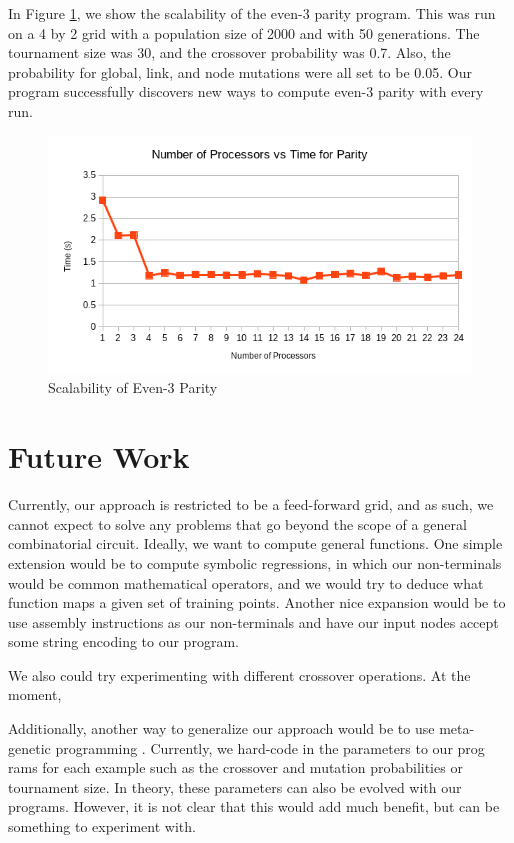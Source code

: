 \documentclass[12pt,conference]{IEEEtran}
\begin{document}
	In Figure \ref{parity_scalability}, we show the scalability of the even-3 parity program. This was run on a 4 by 2 grid with a population size of 2000 and with 50 generations. The tournament size was 30, and the crossover probability was 0.7. Also, the probability for global, link, and node mutations were all set to be 0.05. Our program successfully discovers new ways to compute even-3 parity with every run.

\begin{figure}
	\centering
	\includegraphics{parity_scalability.png}
	\caption{Scalability of Even-3 Parity}
	\label{parity_scalability}
\end{figure}
	
	\section{Future Work}
	
	Currently, our approach is restricted to be a feed-forward grid, and as such, we cannot expect to solve any problems that go beyond the scope of a general combinatorial circuit. Ideally, we want to compute general functions. One simple extension would be to compute symbolic regressions, in which our non-terminals would be common mathematical operators, and we would try to deduce what function maps a given set of training points. Another nice expansion would be to use assembly instructions as our non-terminals and have our input nodes accept some string encoding to our program.
	
	We also could try experimenting with different crossover operations. At the moment, 
	
	Additionally, another way to generalize our approach would be to use meta-genetic programming \cite{b5}. Currently, we hard-code in the parameters to our prog
	rams for each example such as the crossover and mutation probabilities or tournament size. In theory, these parameters can also be evolved with our programs. However, it is not clear that this would add much benefit, but can be something to experiment with.
	
\end{document}
